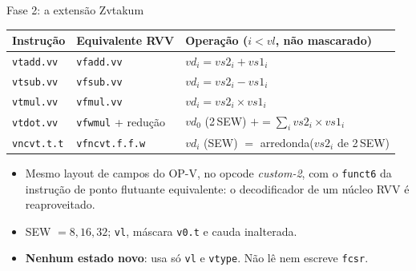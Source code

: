 \documentclass[aspectratio=169,10pt]{beamer}
\newcommand{\code}[1]{\texttt{#1}}
\begin{document}
\begin{frame}{Fase 2: a extensão Zvtakum}
  \centering\small
  \begin{tabular}{lll}
    \toprule
    Instrução & Equivalente RVV & Operação ($i<\mathit{vl}$, não mascarado)\\
    \midrule
    \code{vtadd.vv} & \code{vfadd.vv} & $vd_i = vs2_i + vs1_i$\\
    \code{vtsub.vv} & \code{vfsub.vv} & $vd_i = vs2_i - vs1_i$\\
    \code{vtmul.vv} & \code{vfmul.vv} & $vd_i = vs2_i \times vs1_i$\\
    \code{vtdot.vv} & \code{vfwmul} + redução & $vd_0$ (2\,SEW) $\mathrel{+}= \sum_i vs2_i \times vs1_i$\\
    \code{vncvt.t.t} & \code{vfncvt.f.f.w} & $vd_i$ (SEW) $=$ arredonda($vs2_i$ de 2\,SEW)\\
    \bottomrule
  \end{tabular}
  \vspace{4mm}
  \begin{itemize}
    \item Mesmo layout de campos do OP-V, no opcode \emph{custom-2}, com o \code{funct6} da instrução de ponto
          flutuante equivalente: o decodificador de um núcleo RVV é reaproveitado.
    \item SEW $= 8, 16, 32$; \code{vl}, máscara \code{v0.t} e cauda inalterada.
    \item \textbf{Nenhum estado novo}: usa só \code{vl} e \code{vtype}. Não lê nem escreve \code{fcsr}.
  \end{itemize}
\end{frame}
\end{document}
